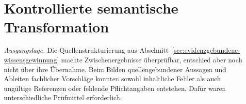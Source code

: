 %
%
%
%

\section{Kontrollierte semantische Transformation}
\label{sec:kontrollierte-semantische-transformation}

\emph{Ausgangslage.} Die Quellenstrukturierung aus
Abschnitt~\ref{sec:evidenzgebundene-wissensgewinnung} machte
Zwischenergebnisse überprüfbar, entschied aber noch nicht über ihre
Übernahme. Beim Bilden quellengebundener Aussagen und Ableiten
fachlicher Vorschläge konnten sowohl inhaltliche Fehler als auch
ungültige Referenzen oder fehlende Pflichtangaben entstehen. Dafür
waren unterschiedliche Prüfmittel erforderlich.

